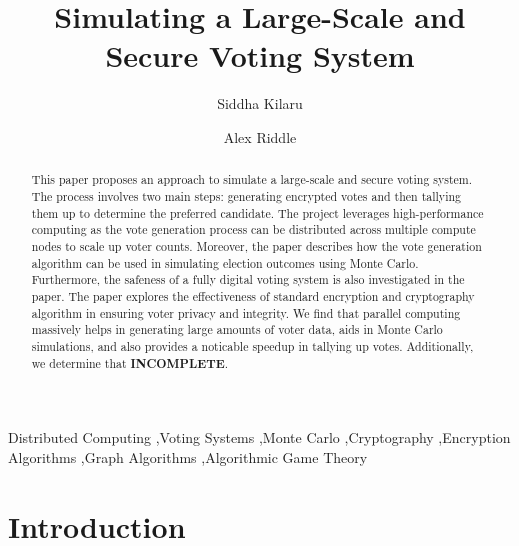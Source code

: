 \documentclass[final,5p,times,twocolumn,authoryear, 10pt]{elsarticle}
\begin{document}
\begin{frontmatter}

\title{Simulating a Large-Scale and Secure Voting System}


\author{Siddha Kilaru}
\author{Alex Riddle}

\address{Rensselaer Polytechnic Institute, Troy, NY}


\begin{abstract}
This paper proposes an approach to simulate a large-scale and secure voting
system. The process involves two main steps: generating encrypted votes and
then tallying them up to determine the preferred candidate. The project
leverages high-performance computing as the vote generation process can be
distributed across multiple compute nodes to scale up voter counts. Moreover,
the paper describes how the vote generation algorithm can be used in simulating
election outcomes using Monte Carlo. Furthermore, the safeness of a fully
digital voting system is also investigated in the paper. The paper explores the
effectiveness of standard encryption and cryptography algorithm in ensuring
voter privacy and integrity. We find that parallel computing massively helps in
generating large amounts of voter data, aids in Monte Carlo simulations, and
also provides a noticable speedup in tallying up votes. Additionally, we
determine that \textbf{INCOMPLETE}.


\end{abstract}

\begin{keyword}
Distributed Computing \sep Voting Systems \sep Monte Carlo \sep Cryptography
\sep Encryption Algorithms \sep Graph Algorithms \sep Algorithmic Game Theory



\end{keyword}


\end{frontmatter}
{ \hypersetup{hidelinks} \tableofcontents}


\section{Introduction}
\label{introduction}
\end{document}
